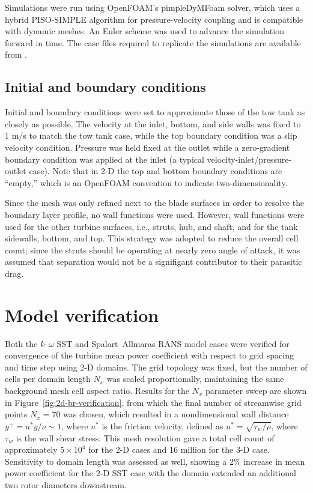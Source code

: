 \documentclass[aip,graphicx]{revtex4-1}
\begin{document}
Simulations were run using OpenFOAM's pimpleDyMFoam solver, which uses a hybrid
PISO-SIMPLE algorithm for pressure-velocity coupling and is compatible with
dynamic meshes. An Euler scheme was used to advance the simulation forward in
time. The case files required to replicate the simulations are available from
\cite{Bachant2016-UNH-RVAT-2D-OpenFOAM-SST, Bachant2016-UNH-RVAT-2D-OpenFOAM-SA,
Bachant2016-UNH-RVAT-3D-OpenFOAM-SST, Bachant2016-UNH-RVAT-3D-OpenFOAM-SA}.


\subsection{Initial and boundary conditions}

Initial and boundary conditions were set to approximate those of the tow tank as
closely as possible. The velocity at the inlet, bottom, and side walls was fixed
to 1 m/s to match the tow tank case, while the top boundary condition was a slip
velocity condition. Pressure was held fixed at the outlet while a zero-gradient
boundary condition was applied at the inlet (a typical
velocity-inlet/pressure-outlet case). Note that in 2-D the top and bottom
boundary conditions are ``empty,'' which is an OpenFOAM convention to indicate
two-dimensionality.

Since the mesh was only refined next to the blade surfaces in order to resolve
the boundary layer profile, no wall functions were used. However, wall functions
were used for the other turbine surfaces, i.e., struts, hub, and shaft, and for
the tank sidewalls, bottom, and top. This strategy was adopted to reduce the
overall cell count; since the struts should be operating at nearly zero angle of
attack, it was assumed that separation would not be a signifigant contributor to
their parasitic drag.


\section{Model verification}

Both the $k$--$\omega$ SST and Spalart--Allmaras RANS model cases were verified
for convergence of the turbine mean power coefficient with respect to grid
spacing and time step using 2-D domains. The grid topology was fixed, but the
number of cells per domain length $N_x$ was scaled proportionally, maintaining
the same background mesh cell aspect ratio. Results for the $N_x$ parameter
sweep are shown in Figure~\ref{fig:2d-br-verification}, from which the final
number of streamwise grid points $N_x = 70$ was chosen, which resulted in a
nondimensional wall distance $y^+ = u^* y / \nu \sim 1$, where $u^*$ is the
friction velocity, defined as $u^*=\sqrt{\tau_w / \rho}$, where $\tau_w$ is the
wall shear stress. This mesh resolution gave a total cell count of approximately
$5 \times 10^4$ for the 2-D cases and 16 million for the 3-D case. Sensitivity
to domain length was assessed as well, showing a 2\% increase in mean power
coefficient for the 2-D SST case with the domain extended an additional two
rotor diameters downstream.
\end{document}
